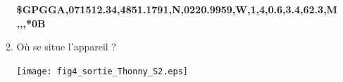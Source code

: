 \documentclass[a4paper,10pt]{article}
\begin{document}
\begin{enumerate}
\begin{enumerate}
\textbf{\$GPGGA,071512.34,4851.1791,N,0220.9959,W,1,4,0.6,3.4,62.3,M,,,*0B}
\item Où se situe l'appareil ?

\begin{center}\texttt{[image: fig4\_sortie\_Thonny\_S2.eps]}\end{center} 

\end{enumerate}
\end{enumerate}
\end{document}
